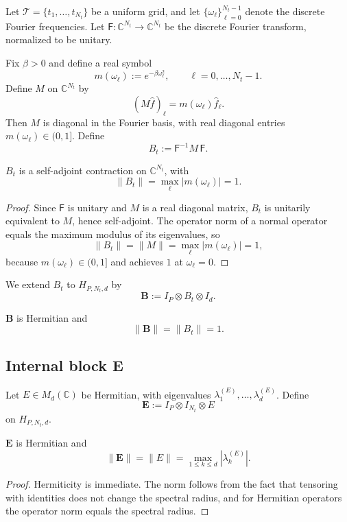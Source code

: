 \documentclass[11pt]{article}
\begin{document}
Let $\mathcal{T}=\{t_1,\dots,t_{N_t}\}$ be a uniform grid, and let $\{\omega_\ell\}_{\ell=0}^{N_t-1}$ denote the discrete Fourier frequencies.
Let $\mathsf{F}:\mathbb{C}^{N_t}\to\mathbb{C}^{N_t}$ be the discrete Fourier transform, normalized to be unitary.

Fix $\beta>0$ and define a real symbol
\[
m(\omega_\ell) := e^{-\beta \omega_\ell^2},\qquad \ell=0,\dots,N_t-1.
\]
Define $M$ on $\mathbb{C}^{N_t}$ by
\[
(M \hat f)_\ell = m(\omega_\ell)\hat f_\ell.
\]
Then $M$ is diagonal in the Fourier basis, with real diagonal entries $m(\omega_\ell)\in (0,1]$.
Define
\[
B_t := \mathsf{F}^{-1} M \,\mathsf{F}.
\]

\begin{lemma}
$B_t$ is a self-adjoint contraction on $\mathbb{C}^{N_t}$, with
\[
\|B_t\| = \max_{\ell} |m(\omega_\ell)| = 1.
\]
\end{lemma}

\begin{proof}
Since $\mathsf{F}$ is unitary and $M$ is a real diagonal matrix,
$B_t$ is unitarily equivalent to $M$, hence self-adjoint.
The operator norm of a normal operator equals the maximum modulus of its eigenvalues, so
\[
\|B_t\| = \|M\| = \max_\ell |m(\omega_\ell)| = 1,
\]
because $m(\omega_\ell)\in (0,1]$ and achieves $1$ at $\omega_\ell=0$.
\end{proof}

We extend $B_t$ to $H_{P,N_t,d}$ by
\[
\mathbf{B} := I_P \otimes B_t \otimes I_d.
\]

\begin{corollary}
$\mathbf{B}$ is Hermitian and
\[
\|\mathbf{B}\| = \|B_t\| = 1.
\]
\end{corollary}

\subsection{Internal block \texorpdfstring{$\mathbf{E}$}{E}}

Let $E\in M_d(\mathbb{C})$ be Hermitian, with eigenvalues $\lambda^{(E)}_1,\dots,\lambda^{(E)}_d$.
Define
\[
\mathbf{E} := I_P \otimes I_{N_t} \otimes E
\]
on $H_{P,N_t,d}$.

\begin{lemma}
$\mathbf{E}$ is Hermitian and
\[
\|\mathbf{E}\| = \|E\| = \max_{1\le k\le d} |\lambda^{(E)}_k|.
\]
\end{lemma}

\begin{proof}
Hermiticity is immediate.
The norm follows from the fact that tensoring with identities does not change the spectral radius, and for Hermitian operators the operator norm equals the spectral radius.
\end{proof}
\end{document}
